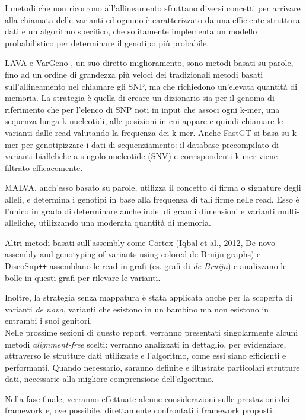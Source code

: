 \documentclass[../main.tex]{subfiles}
\begin{document}
I metodi che non ricorrono all'allineamento sfruttano diversi concetti per arrivare alla chiamata delle varianti ed ognuno è caratterizzato da una efficiente struttura dati e un algoritmo specifico, che solitamente implementa un modello probabilistico per determinare il genotipo più probabile. 

LAVA \cite{shajii2016lava} e VarGeno \cite{sun-medvedev2018vargeno}, un suo diretto miglioramento, sono metodi basati su parole, fino ad un ordine di grandezza più veloci dei tradizionali metodi basati sull'allineamento nel chiamare gli SNP, ma che richiedono un'elevata quantità di memoria. La strategia è quella di creare un dizionario sia per il genoma di riferimento che per l'elenco di SNP noti in input che associ ogni k-mer, una sequenza lunga k nucleotidi, alle posizioni in cui appare e quindi chiamare le varianti dalle read valutando la frequenza dei k mer. Anche FastGT \cite{pajuste2017fastgt} si basa su k-mer per genotipizzare i dati di sequenziamento: il database precompilato di varianti bialleliche a singolo nucleotide (SNV) e corrispondenti k-mer viene filtrato efficacemente.

MALVA, anch'esso basato su parole, utilizza il concetto di firma o signature degli alleli, e determina i genotipi in base alla frequenza di tali firme nelle read. Esso è l'unico in grado di determinare anche indel di grandi dimensioni e varianti multi-alleliche, utilizzando una moderata quantità di memoria.

Altri metodi basati sull'assembly come Cortex (Iqbal et al., 2012, De novo assembly and genotyping of variants using colored de Bruijn graphs) e DiscoSnp\texttt{++} \cite{peterlongo2017discosnp++} assemblano le read in grafi (es. grafi di \textit{de Bruijn}) e analizzano le bolle in questi grafi per rilevare le varianti. 

Inoltre, la strategia senza mappatura è stata applicata anche per la scoperta di varianti \textit{de novo}, varianti che esistono in un bambino ma non esistono in entrambi i suoi genitori.\\


Nelle prossime sezioni di questo report, verranno presentati singolarmente alcuni metodi \textit{alignment-free} scelti: verranno analizzati in dettaglio, per evidenziare, attraverso le strutture dati utilizzate e l'algoritmo, come essi siano efficienti e performanti. Quando necessario, saranno definite e illustrate particolari strutture dati, necessarie alla migliore comprensione dell'algoritmo.

Nella fase finale, verranno effettuate alcune considerazioni sulle prestazioni dei framework e, ove possibile, direttamente confrontati i framework proposti.
\end{document}
